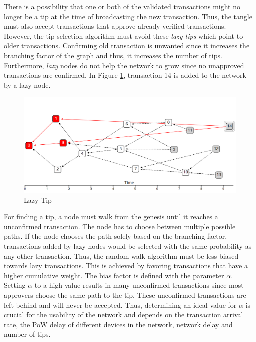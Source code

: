 There is a possibility that one or both of the validated transactions might no longer be a tip at the time of broadcasting the new transaction. Thus, the tangle must also accept transactions that approve already verified transactions. However, the tip selection algorithm must avoid these \textit{lazy tips} which point to older transactions. Confirming old transaction is unwanted since it increases the branching factor of the graph and thus, it increases the number of tips. Furthermore, \textit{lazy} nodes do not help the network to grow since no unapproved transactions are confirmed. In Figure \ref{fig:lazy-tip}, transaction 14 is added to the network by a lazy node. 


\begin{figure}[H]
    \centering
    \includegraphics[width=1.0\textwidth]{images/lazy-tip.png}
    \caption{Lazy Tip \cite{the-tangle-part-1}}
    \label{fig:lazy-tip}
\end{figure}

For finding a tip, a node must walk from the genesis until it reaches a unconfirmed transaction. The node has to choose between multiple possible paths. If the node chooses the path solely based on the branching factor, transactions added by lazy nodes would be selected with the same probability as any other transaction. Thus, the random walk algorithm must be less biased towards lazy transactions. 
This is achieved by favoring transactions that have a higher cumulative weight. The bias factor is defined with the parameter $\alpha$. Setting $\alpha$ to a high value results in many unconfirmed transactions since most approvers choose the same path to the tip. These unconfirmed transactions are left behind and will never be accepted. Thus, determining an ideal value for $\alpha$ is crucial for the usability of the network and depends on the transaction arrival rate, the PoW delay of different devices in the network, network delay and number of tips. 

